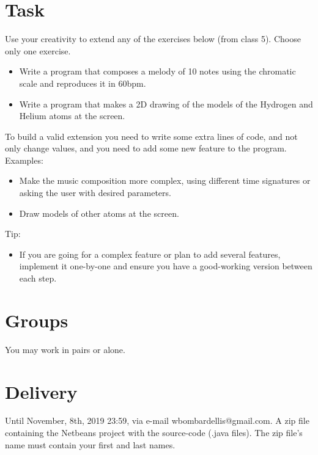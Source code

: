 \documentclass[a4paper]{article}
\begin{document}
	
	
	
	\section{Task}
	Use your creativity to extend any of the exercises below (from class 5). Choose only one exercise.
	\begin{itemize}
		\item Write a program that composes a melody of 10 notes using the chromatic scale and reproduces it in 60bpm.
		\item Write a program that makes a 2D drawing of the models of the Hydrogen and Helium atoms at the screen.
	\end{itemize}
	To build a valid extension you need to write some extra lines of code, and not only change values, and you need to add some new feature to the program. Examples:
	\begin{itemize}
		\item Make the music composition more complex, using different time signatures or asking the user with desired parameters.
		\item Draw models of other atoms at the screen.
	\end{itemize}
	Tip:
	\begin{itemize}
		\item If you are going for a complex feature or plan to add several features, implement it one-by-one and ensure you have a good-working version between each step.
	\end{itemize}

	\section{Groups}
	You may work in pairs or alone.
	
	\section{Delivery}
	Until November, 8th, 2019 23:59, via e-mail wbombardellis@gmail.com. A zip file containing the Netbeans project with the source-code (.java files). The zip file's name must contain your first and last names.
\end{document}
